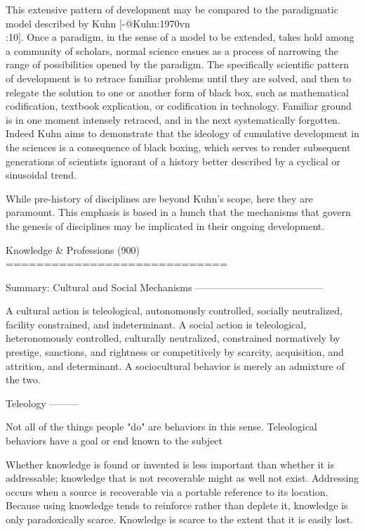This extensive pattern of development may be compared to the
paradigmatic model described by Kuhn [-@Kuhn:1970vn\\:10]. Once a
paradigm, in the sense of a model to be extended, takes hold among a
community of scholars, normal science ensues as a process of narrowing
the range of possibilities opened by the paradigm. The specifically
scientific pattern of development is to retrace familiar problems until
they are solved, and then to relegate the solution to one or another
form of black box, such as mathematical codification, textbook
explication, or codification in technology. Familiar ground is in one
moment intensely retraced, and in the next systematically forgotten.
Indeed Kuhn aims to demonstrate that the ideology of cumulative
development in the sciences is a consequence of black boxing, which
serves to render subsequent generations of scientists ignorant of a
history better described by a cyclical or sinusoidal trend.

While pre-history of disciplines are beyond Kuhn's scope, here they are
paramount. This emphasis is based in a hunch that the mechanisms that
govern the genesis of disciplines may be implicated in their ongoing
development.

Knowledge & Professions (900)
=============================

Summary: Cultural and Social Mechanisms
---------------------------------------

A cultural action is teleological, autonomously controlled, socially
neutralized, facility constrained, and indeterminant. A social action is
teleological, heteronomously controlled, culturally neutralized,
constrained normatively by prestige, sanctions, and rightness or
competitively by scarcity, acquisition, and attrition, and determinant.
A sociocultural behavior is merely an admixture of the two.

Teleology
---------

Not all of the things people "do" are behaviors in this sense.
Teleological behaviors have a goal or end known to the subject

Whether knowledge is found or invented is less important than whether it
is addressable; knowledge that is not recoverable might as well not
exist. Addressing occurs when a source is recoverable via a portable
reference to its location. Because using knowledge tends to reinforce
rather than deplete it, knowledge is only paradoxically scarce.
Knowledge is scarce to the extent that it is easily lost.


